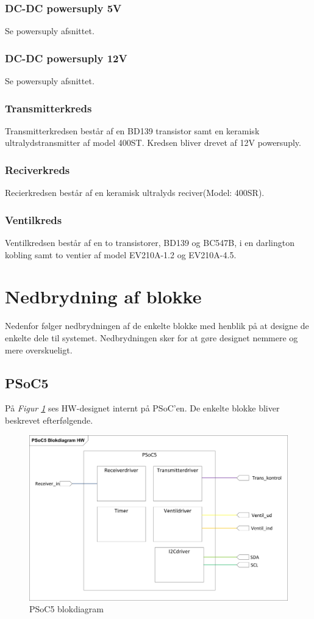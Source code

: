 \subsubsection{DC-DC powersuply 5V}
Se powersuply afsnittet.
\subsubsection{DC-DC powersuply 12V}
Se powersuply afsnittet.
\subsubsection{Transmitterkreds}
Transmitterkredsen består af en BD139 transistor samt en keramisk ultralydstransmitter af model 400ST. Kredsen bliver drevet af 12V powersuply.
\subsubsection{Reciverkreds}
Recierkredsen består af en keramisk ultralyds reciver(Model: 400SR).
\subsubsection{Ventilkreds}
Ventilkredsen består af en to transistorer, BD139 og BC547B, i en darlington kobling samt to ventier af model EV210A-1.2 og EV210A-4.5.
\newpage
\section{Nedbrydning af blokke}
Nedenfor følger nedbrydningen af de enkelte blokke med henblik på at designe de enkelte dele til systemet. Nedbrydningen sker for at gøre designet nemmere og mere overskueligt.
\subsection{PSoC5}
På \textit{Figur \ref{fig:PSoCBlok}} ses HW-designet internt på PSoC'en. De enkelte blokke bliver beskrevet efterfølgende.
\begin{figure}[H]
\centering
\includegraphics[width=1\textwidth]{billeder/PSoCBlock}
\caption{PSoC5 blokdiagram}
\label{fig:PSoCBlok}
\end{figure}
